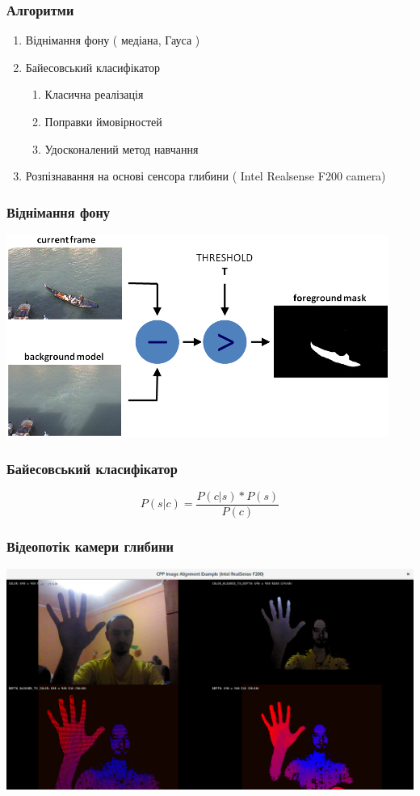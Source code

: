 \begin{frame}
	\manimate
	\frametitle{Алгоритми}
	\begin{enumerate}
		\item Віднімання фону ( медіана, Гауса )
		\item Байесовський класифікатор \\
		\begin{enumerate} 
			\item Класична реалізація
			\item Поправки ймовірностей
			\item Удосконалений метод навчання
		\end{enumerate}
		\item Розпізнавання на основі сенсора глибини ( Intel Realsense F200 camera)
	\end{enumerate}
	
\end{frame}

\begin{frame}
	\manimate
	\frametitle{Віднімання фону}
	\includegraphics[width=1.0\linewidth]{im/background_substraction}
\end{frame}

\begin{frame}
	\manimate
	\frametitle{Байесовський класифікатор}
	\begin{equation}
		P(s|c) = \frac{P(c|s) * P(s)}{P(c)}
	\end{equation}
\end{frame}

\begin{frame}
	\manimate
	\frametitle{Відеопотік камери глибини}
	\includegraphics[width=1.0\linewidth]{im/depth_camera}
\end{frame}